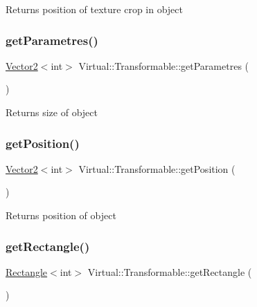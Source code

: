 \begin{DoxyReturn}{Returns}
position of texture crop in object 
\end{DoxyReturn}
\hypertarget{class_virtual_1_1_transformable_a816bf127c89675265776e94ef849e6e8}{}\label{class_virtual_1_1_transformable_a816bf127c89675265776e94ef849e6e8} 
\subsubsection{\texorpdfstring{get\+Parametres()}{getParametres()}}
{\footnotesize\ttfamily \hyperlink{struct_virtual_1_1_vector2}{Vector2}$<$int$>$ Virtual\+::\+Transformable\+::get\+Parametres (\begin{DoxyParamCaption}{ }\end{DoxyParamCaption})}

\begin{DoxyReturn}{Returns}
size of object 
\end{DoxyReturn}
\hypertarget{class_virtual_1_1_transformable_a2bb830f06c5123ae69d0584eef5f16f3}{}\label{class_virtual_1_1_transformable_a2bb830f06c5123ae69d0584eef5f16f3} 
\subsubsection{\texorpdfstring{get\+Position()}{getPosition()}}
{\footnotesize\ttfamily \hyperlink{struct_virtual_1_1_vector2}{Vector2}$<$int$>$ Virtual\+::\+Transformable\+::get\+Position (\begin{DoxyParamCaption}{ }\end{DoxyParamCaption})}

\begin{DoxyReturn}{Returns}
position of object 
\end{DoxyReturn}
\hypertarget{class_virtual_1_1_transformable_aa25efa18322fe9eaa187cd7cb54909ae}{}\label{class_virtual_1_1_transformable_aa25efa18322fe9eaa187cd7cb54909ae} 
\subsubsection{\texorpdfstring{get\+Rectangle()}{getRectangle()}}
{\footnotesize\ttfamily \hyperlink{struct_virtual_1_1_rectangle}{Rectangle}$<$int$>$ Virtual\+::\+Transformable\+::get\+Rectangle (\begin{DoxyParamCaption}{ }\end{DoxyParamCaption})}

